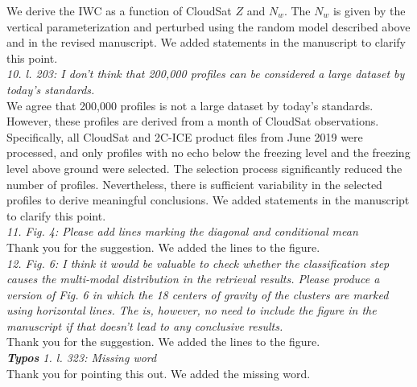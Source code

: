 \documentclass[12pt]{article}
\begin{document}
\newline
We derive the IWC as a function of CloudSat $Z$ and $N_w$.  The $N_w$ is given by the vertical parameterization and perturbed using the random model
described above and in the revised manuscript.  We added statements in the manuscript to clarify this point.\\
\newline
\textit{10. l. 203: I don't think that 200,000 profiles can be considered a large dataset by today's standards.}\\
\newline
We agree that 200,000 profiles is not a large dataset by today's standards.  However, these profiles are derived from a month of CloudSat observations.
Specifically, all CloudSat and 2C-ICE product files from June 2019 were processed, and only profiles with no echo below the freezing level
and the freezing level above ground were selected. The selection process significantly reduced the number of profiles. Nevertheless, there is sufficient
variability in the selected profiles to derive meaningful conclusions. We added statements in the manuscript to clarify this point.\\
\newline
\textit{11. Fig. 4: Please add lines marking the diagonal and conditional mean}\\
\newline
Thank you for the suggestion. We added the lines to the figure.\\
\newline   
\textit{12. Fig. 6: I think it would be valuable to check whether the classification step causes the multi-modal distribution 
    in the retrieval results. Please produce a version of Fig. 6 in which the 18 centers of gravity of the clusters 
    are marked using horizontal lines. The is, however, no need to include the figure in the manuscript if that doesn't lead
     to any conclusive results.}\\
\newline
Thank you for the suggestion.  We added the lines to the figure.\\
\newline  
\textit{\textbf{Typos}
    1. l. 323: Missing word}\\
\newline
Thank you for pointing this out.  We added the missing word.\\
\newline
\end{document}
